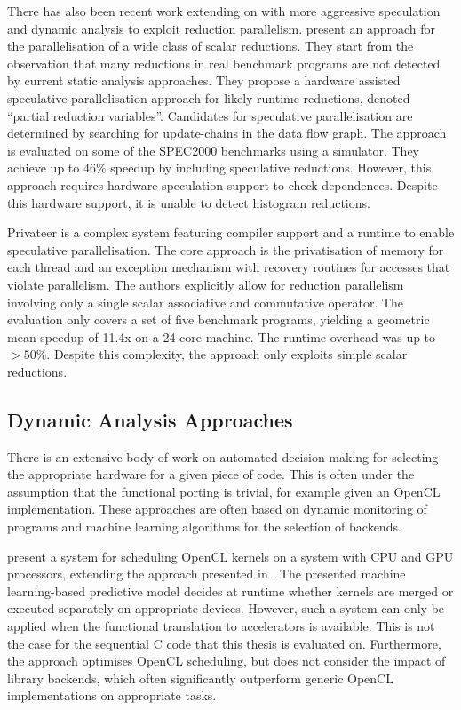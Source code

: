     There has also been recent work extending on \citet{rauchwerger1999lrpd}
    with more aggressive speculation and dynamic analysis
    \citep{aguilar2015unified} to exploit reduction parallelism.
    \citet{Han2010Speculative} present an approach for the
    parallelisation of a wide class of scalar reductions.
    They start from the observation that many reductions in real benchmark
    programs are not detected by current static analysis approaches.
    They propose a hardware assisted speculative parallelisation approach for
    likely runtime reductions, denoted ``partial reduction variables''.
    Candidates for speculative parallelisation are determined by searching for
    update-chains in the data flow graph.
    The approach is evaluated on some of the SPEC2000 benchmarks using a
    simulator.
    They achieve up to $46\%$ speedup by including speculative reductions.
    However, this approach requires hardware speculation support to check
    dependences.
    Despite this hardware support, it is unable to detect histogram reductions.

    Privateer \citep{Johnson:2012:SSP:2254064.2254107} is a complex system
    featuring compiler support and a runtime to enable speculative
    parallelisation.
    The core approach is the privatisation of memory for each thread and an
    exception mechanism with recovery routines for accesses that violate
    parallelism.
    The authors explicitly allow for reduction parallelism involving only a
    single scalar associative and commutative operator.
    The evaluation only covers a set of five benchmark programs, yielding
    a geometric mean speedup of 11.4x on a 24 core machine.
    The runtime overhead was up to $>50\%$.
    Despite this complexity, the approach only exploits simple scalar reductions.

\subsection{Dynamic Analysis Approaches}

    There is an extensive body of work on automated decision making for
    selecting the appropriate hardware for a given piece of code.
    This is often under the assumption that the functional porting is trivial,
    for example given an OpenCL implementation.
    These approaches are often based on dynamic monitoring of programs
    and machine learning algorithms for the selection of backends.

    \citet{Wen:2017:MSM:3038228.3038235} present a system for scheduling OpenCL
    kernels on a system with CPU and GPU processors, extending the approach
    presented in \citet{7116910}.
    The presented machine learning-based predictive model decides at runtime
    whether kernels are merged or executed separately on appropriate devices.
    However, such a system can only be applied when the functional translation
    to accelerators is available.
    This is not the case for the sequential C code that this thesis is evaluated
    on.
    Furthermore, the approach optimises OpenCL scheduling, but does not consider
    the impact of library backends, which often significantly outperform generic
    OpenCL implementations on appropriate tasks.

